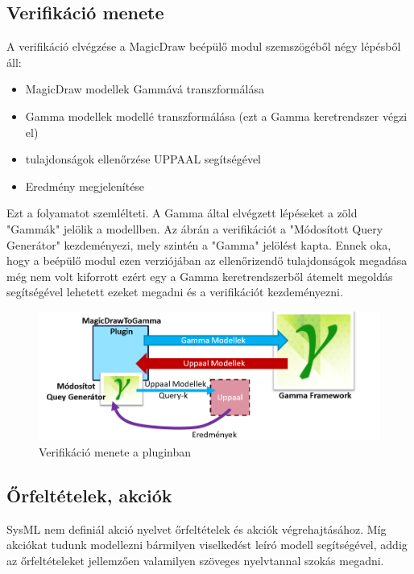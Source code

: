\subsection{Verifikáció menete}

A verifikáció elvégzése a MagicDraw beépülő modul szemszögéből négy lépésből áll: 
\begin{itemize}
	\item MagicDraw modellek Gammává transzformálása
	\item Gamma modellek \uppaal modellé transzformálása (ezt a Gamma keretrendszer végzi el)
	\item tulajdonságok ellenőrzése UPPAAL segítségével
	\item Eredmény megjelenítése
\end{itemize}
Ezt a folyamatot  szemlélteti. A Gamma által elvégzett lépéseket a zöld "Gammák" jelölik a modellben. Az ábrán a verifikációt a "Módosított Query Generátor" kezdeményezi, mely szintén a "Gamma" jelölést kapta. Ennek oka, hogy a beépülő modul ezen verziójában az ellenőrizendő tulajdonságok megadása még nem volt kiforrott ezért egy a Gamma keretrendszerből átemelt megoldás segítségével lehetett ezeket megadni és a verifikációt kezdeményezni. 

\begin{figure}[!ht]
	\centering
	\includegraphics[width=150mm, keepaspectratio]{figures/preliminaries/concept.png}
	\caption{Verifikáció menete a pluginban}
	\label{fig:preliminaries-verif}
\end{figure}

\subsection{Őrfeltételek, akciók}

SysML nem definiál akció nyelvet őrfeltételek és akciók végrehajtásához. Míg akciókat tudunk modellezni bármilyen viselkedést leíró modell segítségével, addig az őrfeltételeket jellemzően valamilyen szöveges nyelvtannal szokás megadni.

